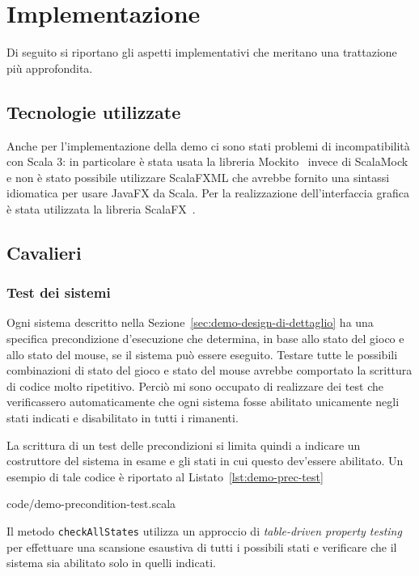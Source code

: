 \section{Implementazione}\label{sec:demo-implementazione}
Di seguito si riportano gli aspetti implementativi che meritano una trattazione più approfondita.

\subsection{Tecnologie utilizzate}\label{subsec:demo-tecnologie-utilizzate}
Anche per l'implementazione della demo ci sono stati problemi di incompatibilità con Scala 3:
in particolare è stata usata la libreria Mockito~\cite{mockito} invece di ScalaMock e non è stato possibile utilizzare
ScalaFXML che avrebbe fornito una sintassi idiomatica per usare JavaFX da Scala\@.
Per la realizzazione dell'interfaccia grafica è stata utilizzata la libreria ScalaFX~\cite{scalafx}\@.

\subsection{Cavalieri}\label{subsec:demo-cavalieri}
\subsubsection{Test dei sistemi}
Ogni sistema descritto nella Sezione~\ref{sec:demo-design-di-dettaglio} ha una specifica precondizione d'esecuzione
che determina, in base allo stato del gioco e allo stato del mouse, se il sistema può essere eseguito.
Testare tutte le possibili combinazioni di stato del gioco e stato del mouse avrebbe comportato la scrittura di codice
molto ripetitivo.
Perciò mi sono occupato di realizzare dei test che verificassero automaticamente che ogni sistema
fosse abilitato unicamente negli stati indicati e disabilitato in tutti i rimanenti.

La scrittura di un test delle precondizioni si limita quindi a indicare un costruttore del sistema in esame e
gli stati in cui questo dev'essere abilitato.
Un esempio di tale codice è riportato al Listato~\ref{lst:demo-prec-test}


{code/demo-precondition-test.scala}

Il metodo \texttt{checkAllStates} utilizza un approccio di \textit{table-driven property testing} per effettuare
una scansione esaustiva di tutti i possibili stati e verificare che il sistema sia abilitato solo in quelli indicati.

